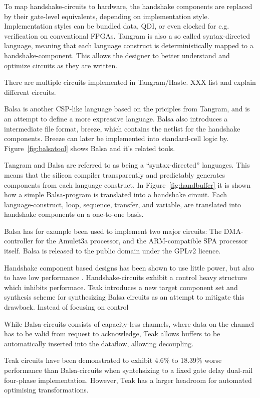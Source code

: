 To map handshake-circuits to hardware, the handshake components are
replaced by their gate-level equivalents, depending on implementation
style. Implementation styles can be bundled data, QDI, or even clocked
for e.g. verification on conventional FPGAs. Tangram is also a so
called syntax-directed language, meaning that each language construct
is deterministically mapped to a handshake-component. This allows the
designer to better understand and optimize circuits as they are
written.


There are multiple circuits implemented in Tangram/Haste. XXX list and
explain different circuits.

Balsa is another CSP-like language based on the priciples from Tangram,
and is an attempt to define a more expressive language. Balsa also
introduces a intermediate file format, breeze, which contains the
netlist for the handshake components. Breeze can later be implemented
into standard-cell logic by. Figure~\ref{fig:balsatool} shows Balsa
and it's related tools.

Tangram and Balsa are referred to as being a ``syntax-directed''
languages. This means that the silicon compiler transparently and
predictably generates components from each language construct. In
Figure~\ref{fig:handbuffer} it is shown how a simple Balsa-program is
translated into a handshake circuit. Each language-construct, loop,
sequence, transfer, and variable, are translated into handshake
components on a one-to-one basis.

Balsa has for example been used to implement two major circuits: The
DMA-controller for the Amulet3a processor, and the ARM-compatible SPA
processor itself. Balsa is released to the public domain under the
GPLv2 licence.

Handshake component based designs has been shown to use little power,
but also to have low performance \cite{80c51}. Handshake-circuits
exhibit a control heavy structure which inhibits performace. Teak
\cite{teak} introduces a new target component set and synthesis scheme
for synthesizing Balsa circuits as an attempt to mitigate this
drawback. Instead of focusing on control

While Balsa-circuits consists of capacity-less channels, where data on
the channel has to be valid from request to acknowledge, Teak allows
buffers to be automatically inserted into the dataflow, allowing
decoupling. 

Teak circuits have been demonstrated to exhibit 4.6\% to 18.39\% worse
performance than Balsa-circuits when syntehsizing to a fixed gate
delay dual-rail four-phase implementation. However, Teak has a larger
headroom for automated optimising transformations.

